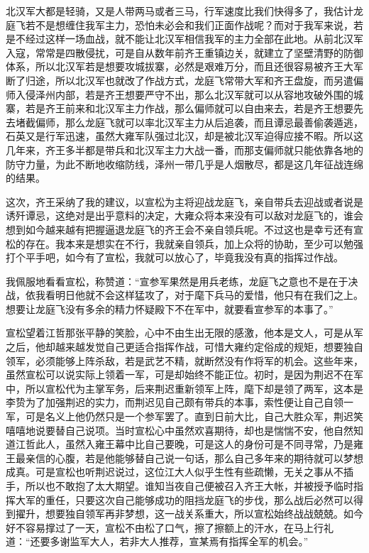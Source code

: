 北汉军大都是轻骑，又是人带两马或者三马，行军速度比我们快得多了，我估计龙庭飞若不是想缠住我军主力，恐怕未必会和我们正面作战呢？而对于我军来说，若是不经过这样一场血战，就不能让北汉军相信我军的主力全部在此地。从前北汉军入寇，常常是四散侵扰，可是自从数年前齐王重镇边关，就建立了坚壁清野的防御体系，所以北汉军若是想要攻城拔寨，必然是艰难万分，而且还很容易被齐王大军断了归途，所以北汉军也就改了作战方式，龙庭飞常带大军和齐王盘旋，而另遣偏师入侵泽州内部，若是齐王想要严守不出，那么北汉军就可以从容地攻破外围的城寨，若是齐王前来和北汉军主力作战，那么偏师就可以自由来去，若是齐王想要先去堵截偏师，那么龙庭飞就可以率北汉军主力从后追袭，而且谭忌最善偷袭遁逃，石英又是行军迅速，虽然大雍军队强过北汉，却是被北汉军迫得应接不暇。所以这几年来，齐王多半都是带兵和北汉军主力大战一番，而那支偏师就只能依靠各地的防守力量，为此不断地收缩防线，泽州一带几乎是人烟散尽，都是这几年征战连绵的结果。

这次，齐王采纳了我的建议，以宣松为主将迎战龙庭飞，亲自带兵去迎战或者说是诱歼谭忌，这绝对是出乎意料的决定，大雍众将本来没有可以敌对龙庭飞的，谁会想到如今越来越有把握逼退龙庭飞的齐王会不亲自领兵呢。不过这也是幸亏还有宣松的存在。我本来是想实在不行，我就亲自领兵，加上众将的协助，至少可以勉强打个平手吧，如今有了宣松，我就可以放心了，毕竟我没有真的指挥过作战。

我佩服地看看宣松，称赞道：“宣参军果然是用兵老练，龙庭飞之意也不是在于决战，依我看明日他就不会这样猛攻了，对于麾下兵马的爱惜，他只有在我们之上。想要让龙庭飞没有多余的精力怀疑殿下不在军中，就要看宣参军的本事了。”

宣松望着江哲那张平静的笑脸，心中不由生出无限的感激，他本是文人，可是从军之后，他却越来越发觉自己更适合指挥作战，可惜大雍约定俗成的规矩，想要独自领军，必须能够上阵杀敌，若是武艺不精，就断然没有作将军的机会。这些年来，虽然宣松可以说实际上领着一军，可是却始终不能正位。初时，是因为荆迟不在军中，所以宣松代为主掌军务，后来荆迟重新领军上阵，麾下却是领了两军，这本是李贽为了加强荆迟的实力，而荆迟见自己颇有带兵的本事，索性便让自己自领一军，可是名义上他仍然只是一个参军罢了。直到日前大比，自己大胜众军，荆迟笑嘻嘻地说要替自己说项。当时宣松心中虽然欢喜期待，却也是惴惴不安，他自然知道江哲此人，虽然入雍王幕中比自己要晚，可是这人的身份可是不同寻常，乃是雍王最亲信的心腹，若是他能够替自己说一句话，那么自己多年来的期待就可以梦想成真。可是宣松也听荆迟说过，这位江大人似乎生性有些疏懒，无关之事从不插手，所以也不敢抱了太大期望。谁知当夜自己便被召入齐王大帐，并被授予临时指挥大军的重任，只要这次自己能够成功的阻挡龙庭飞的步伐，那么战后必然可以得到擢升，想要独自领军再非梦想，这一战关系重大，所以宣松始终战战兢兢。如今好不容易撑过了一天，宣松不由松了口气，擦了擦额上的汗水，在马上行礼道：“还要多谢监军大人，若非大人推荐，宣某焉有指挥全军的机会。”

